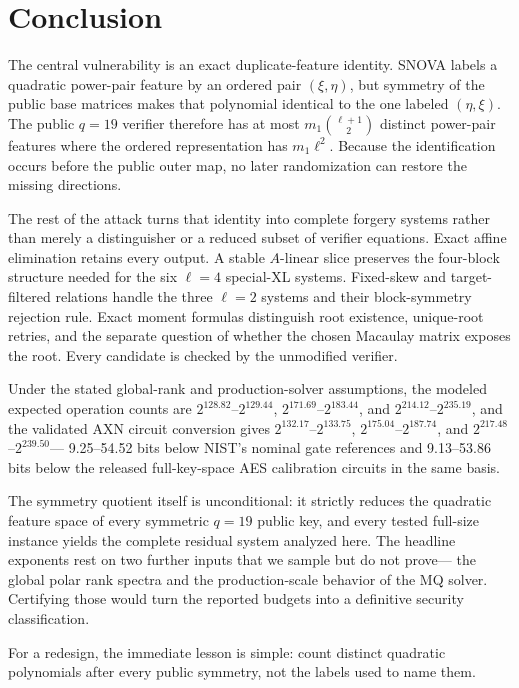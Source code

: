 \documentclass[11pt]{article}
\newcommand{\SNOVA}{\textsf{SNOVA}}
\newcommand{\LoneModelRange}{$2^{128.82}$--$2^{129.44}$}
\newcommand{\LthreeModelRange}{$2^{171.69}$--$2^{183.44}$}
\newcommand{\LfiveModelRange}{$2^{214.12}$--$2^{235.19}$}
\newcommand{\LoneAXNRange}{$2^{132.17}$--$2^{133.75}$}
\newcommand{\LthreeAXNRange}{$2^{175.04}$--$2^{187.74}$}
\newcommand{\LfiveAXNRange}{$2^{217.48}$--$2^{239.50}$}
\newcommand{\AXNNominalHeadroomRange}{9.25--54.52}
\newcommand{\AXNFullAESGapRange}{9.13--53.86}
\begin{document}
\section{Conclusion}\label{sec:conclusion}

The central vulnerability is an exact duplicate-feature identity.  \SNOVA{}
labels a quadratic power-pair feature by an ordered pair $(\xi,\eta)$, but
symmetry of the public base matrices makes that polynomial identical to the
one labeled $(\eta,\xi)$.  The public $q=19$ verifier therefore has at most
$m_1\binom{\ell+1}{2}$ distinct power-pair features where the ordered
representation has $m_1\ell^2$.  Because the identification occurs before the
public outer map, no later randomization can restore the missing directions.

The rest of the attack turns that identity into complete forgery systems rather
than merely a distinguisher or a reduced subset of verifier equations.  Exact
affine elimination retains every output.  A stable $A$-linear slice preserves
the four-block structure needed for the six $\ell=4$ special-XL systems.
Fixed-skew and target-filtered relations handle the three $\ell=2$ systems and
their block-symmetry rejection rule.  Exact moment formulas distinguish root
existence, unique-root retries, and the separate question of whether the
chosen Macaulay matrix exposes the root.  Every candidate is checked by the
unmodified verifier.

Under the stated global-rank and production-solver assumptions, the modeled
expected operation counts are \LoneModelRange, \LthreeModelRange, and
\LfiveModelRange, and the validated AXN circuit conversion gives
\LoneAXNRange, \LthreeAXNRange, and \LfiveAXNRange---%
\AXNNominalHeadroomRange{} bits below NIST's nominal gate references and
\AXNFullAESGapRange{} bits below the released full-key-space AES calibration
circuits in the same basis.

The symmetry quotient itself is unconditional: it strictly reduces the
quadratic feature space of every symmetric $q=19$ public key, and every tested
full-size instance yields the complete residual system analyzed here.  The
headline exponents rest on two further inputs that we sample but do not prove---%
the global polar rank spectra and the production-scale behavior of the MQ
solver.  Certifying those would turn the reported budgets into a definitive
security classification.

For a redesign, the immediate lesson is simple: count distinct quadratic
polynomials after every public symmetry, not the labels used to name them.
\end{document}
